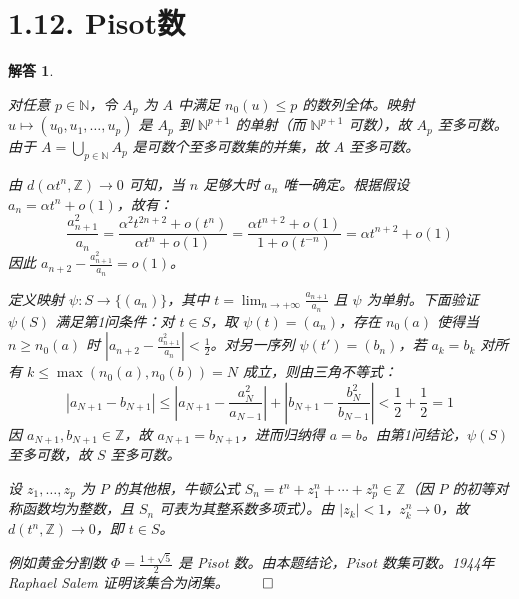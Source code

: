 \documentclass[12pt,UTF8]{ctexbook}
\theoremstyle{exercisestyle}
\theoremstyle{solutionstyle}
\newtheorem*{solution*}{解答}
\newenvironment{solution}
  {\begin{solution*}}
  {\hfill\ensuremath{\qed}\end{solution*}}
\begin{document}
\section{1.12. Pisot数}
\begin{solution}
  \begin{subquestions}
    \item 对任意 $p \in \mathbb{N}$，令 $A_p$ 为 $A$ 中满足 $n_0(u) \leq p$ 的数列全体。映射 $u \mapsto (u_0, u_1, \ldots, u_p)$ 是 $A_p$ 到 $\mathbb{N}^{p+1}$ 的单射（而 $\mathbb{N}^{p+1}$ 可数），故 $A_p$ 至多可数。由于 $A = \bigcup_{p \in \mathbb{N}} A_p$ 是可数个至多可数集的并集，故 $A$ 至多可数。
    
    \item 由 $d(\alpha t^n, \mathbb{Z}) \to 0$ 可知，当 $n$ 足够大时 $a_n$ 唯一确定。根据假设 $a_n = \alpha t^n + o(1)$，故有：
    $$
    \frac{a_{n+1}^2}{a_n} = \frac{\alpha^2 t^{2n+2} + o(t^n)}{\alpha t^n + o(1)} = \frac{\alpha t^{n+2} + o(1)}{1 + o(t^{-n})} = \alpha t^{n+2} + o(1)
    $$
    因此 $a_{n+2} - \frac{a_{n+1}^2}{a_n} = o(1)$。

    定义映射 $\psi: S \to \{(a_n)\}$，其中 $t = \lim_{n \to +\infty} \frac{a_{n+1}}{a_n}$ 且 $\psi$ 为单射。下面验证 $\psi(S)$ 满足第1问条件：对 $t \in S$，取 $\psi(t) = (a_n)$，存在 $n_0(a)$ 使得当 $n \geq n_0(a)$ 时 $\left| a_{n+2} - \frac{a_{n+1}^2}{a_n} \right| < \frac{1}{2}$。对另一序列 $\psi(t') = (b_n)$，若 $a_k = b_k$ 对所有 $k \leq \max(n_0(a), n_0(b)) = N$ 成立，则由三角不等式：
    $$
    |a_{N+1} - b_{N+1}| \leq \left|a_{N+1} - \frac{a_N^2}{a_{N-1}}\right| + \left|b_{N+1} - \frac{b_N^2}{b_{N-1}}\right| < \frac{1}{2} + \frac{1}{2} = 1
    $$
    因 $a_{N+1}, b_{N+1} \in \mathbb{Z}$，故 $a_{N+1} = b_{N+1}$，进而归纳得 $a = b$。由第1问结论，$\psi(S)$ 至多可数，故 $S$ 至多可数。

    \item 设 $z_1, \ldots, z_p$ 为 $P$ 的其他根，牛顿公式 $S_n = t^n + z_1^n + \cdots + z_p^n \in \mathbb{Z}$（因 $P$ 的初等对称函数均为整数，且 $S_n$ 可表为其整系数多项式）。由 $|z_k| < 1$，$z_k^n \to 0$，故 $d(t^n, \mathbb{Z}) \to 0$，即 $t \in S$。
  \end{subquestions}
  例如黄金分割数 $\Phi = \frac{1+\sqrt{5}}{2}$ 是 Pisot 数。由本题结论，Pisot 数集可数。1944年 Raphael Salem 证明该集合为闭集。
\end{solution}
\end{document}
